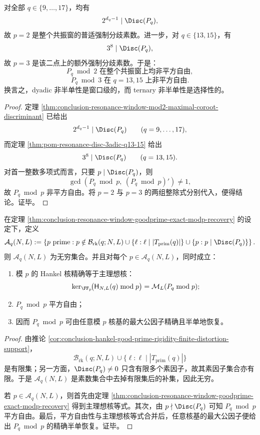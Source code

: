 \begin{corollary}[共振窗的强制分歧素数]\label{cor:conclusion-resonance-window-forced-ramification-primes}
对全部 \(q\in\{9,\dots,17\}\)，均有
\[
2^{d_q-1}\mid \Disc(P_q),
\]
故 \(p=2\) 是整个共振窗的普适强制分歧素数。进一步，对 \(q\in\{13,15\}\)，有
\[
3^8\mid \Disc(P_q),
\]
故 \(p=3\) 是该二点上的额外强制分歧素数。于是：
\[
P_q\bmod 2 \text{ 在整个共振窗上均非平方自由},
\]
\[
P_q\bmod 3 \text{ 在 } q=13,15 \text{ 上非平方自由}.
\]
换言之，dyadic 非半单性是窗口级的，而 ternary 非半单性是选择性的。
\end{corollary}
\begin{proof}
定理 \ref{thm:conclusion-resonance-window-mod2-maximal-coroot-discriminant} 已给出
\[
2^{d_q-1}\mid \Disc(P_q)
\qquad(q=9,\dots,17),
\]
而定理 \ref{thm:pom-resonance-disc-3adic-q13-15} 给出
\[
3^8\mid \Disc(P_q)
\qquad(q=13,15).
\]
对首一整数多项式而言，只要 \(p\mid \Disc(P_q)\)，则
\[
\gcd(P_q\bmod p,\ (P_q\bmod p)')\neq 1,
\]
故 \(P_q\bmod p\) 非平方自由。将 \(p=2\) 与 \(p=3\) 的两组整除式分别代入，便得结论。证毕。
\end{proof}

\begin{theorem}[无穷多完全可审计素数]\label{thm:conclusion-resonance-window-infinitely-many-fully-auditable-primes}
在定理 \ref{thm:conclusion-resonance-window-goodprime-exact-modp-recovery} 的设定下，定义
\[
\mathcal A_q(N,L):=
\left\{
p\ \text{prime}:
p\notin
\mathcal B_{\mathrm{rk}}(q;N,L)
\cup
\{\ell:\ell\mid |T_{\mathrm{prim}}(q)|\}
\cup
\{p:p\mid \Disc(P_q)\}
\right\}.
\]
则 \(\mathcal A_q(N,L)\) 为无穷集合。并且对每个 \(p\in\mathcal A_q(N,L)\)，同时成立：
\begin{enumerate}
  \item 模 \(p\) 的 Hankel 核精确等于主理想核：
  \[
  \ker_{\FF_p}\!\bigl(\mathsf H_{N,L}(q)\bmod p\bigr)
  =
  \mathcal M_L(P_q\bmod p);
  \]
  \item \(P_q\bmod p\) 平方自由；
  \item 因而 \(P_q\bmod p\) 可由任意模 \(p\) 核基的最大公因子精确且半单地恢复。
\end{enumerate}
\end{theorem}
\begin{proof}
由推论 \ref{cor:conclusion-hankel-good-prime-rigidity-finite-distortion-support}，
\[
\mathcal B_{\mathrm{rk}}(q;N,L)
\cup
\{\ell:\ell\mid |T_{\mathrm{prim}}(q)|\}
\]
是有限集；另一方面，\(\Disc(P_q)\neq 0\) 只含有限多个素因子，故其素因子集合亦有限。于是 \(\mathcal A_q(N,L)\) 是素数集合中去掉有限集后的补集，因此无穷。

若 \(p\in\mathcal A_q(N,L)\)，则首先由定理 \ref{thm:conclusion-resonance-window-goodprime-exact-modp-recovery} 得到主理想核等式。其次，由 \(p\nmid\Disc(P_q)\) 可知 \(P_q\bmod p\) 平方自由。最后，平方自由性与主理想核等式合并后，任意核基的最大公因子便给出 \(P_q\bmod p\) 的精确半单恢复。证毕。
\end{proof}

